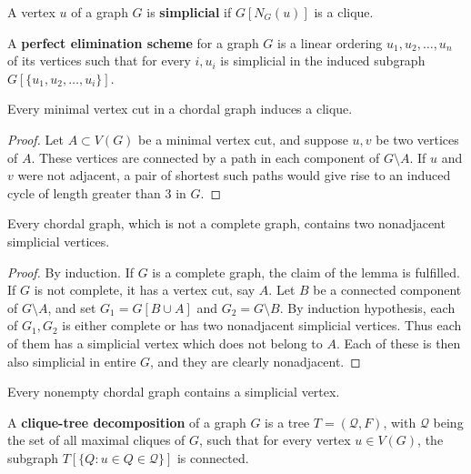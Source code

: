 \begin{defn}
	A vertex $u$ of a graph $G$ is \textbf{simplicial} if $G[N_G(u)]$ is a clique.
\end{defn}

\begin{defn}[PES]
	A \textbf{perfect elimination scheme} for a graph $G$ is a linear ordering $u_1, u_2, \dots, u_n$ of its vertices such that for every $i, u_i$ is simplicial in the induced subgraph $G[\{u_1, u_2, \dots, u_i\}]$.
\end{defn}

\begin{lemma}
	Every minimal vertex cut in a chordal graph induces a clique.
\end{lemma}

\begin{proof}
	Let $A \subset V(G)$ be a minimal vertex cut, and suppose $u, v$ be two vertices of $A$. These vertices	are connected by a path in each component of $G \setminus A$. If $u$ and $v$ were not adjacent, a pair of shortest such paths would give rise to an induced cycle of length greater than 3 in $G$.
\end{proof}

\begin{lemma}
	Every chordal graph, which is not a complete graph, contains two nonadjacent simplicial vertices.
\end{lemma}

\begin{proof}
	By induction. If $G$ is a complete graph, the claim of the lemma is fulfilled. If $G$ is not complete, it has a vertex cut, say $A$. Let $B$ be a connected component of $G \setminus A$, and set $G_1 = G[B \cup A]$ and $G_2 = G \setminus B$. By induction hypothesis, each of $G_1, G_2$ is either complete or has two nonadjacent simplicial vertices. Thus each of them has a simplicial vertex which does not belong to $A$. Each of	these is then also simplicial in entire $G$, and they are clearly nonadjacent.
\end{proof}

\begin{cor}
	Every nonempty chordal graph contains a simplicial vertex.
\end{cor}

\begin{defn}
	A \textbf{clique-tree decomposition} of a graph $G$ is a tree $T = (\mathcal{Q}, F)$, with $\mathcal{Q}$ being the set of all maximal cliques of $G$, such that for every vertex $u \in V(G)$, the subgraph $T[\{Q : u \in Q \in \mathcal{Q}\}]$ is connected.
\end{defn}

